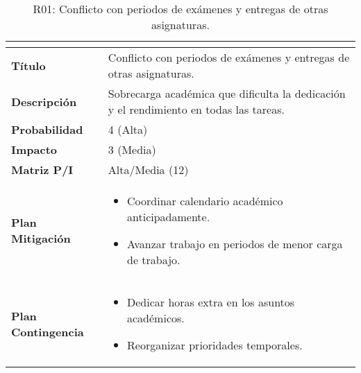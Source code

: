 \begin{table}[H]
\centering
\begin{tabular}{|>{\bfseries}l|p{10cm}|}
\hline
\rowcolor{lightgray}
\multicolumn{2}{|c|}{\textbf{Riesgo R01}} \\ \hline
Título & Conflicto con periodos de exámenes y entregas de otras asignaturas.\\ \hline
Descripción & Sobrecarga académica que dificulta la dedicación y el rendimiento en todas las tareas. \\ \hline
Probabilidad & 4 (Alta) \cellcolor{orangerisk} \\ \hline
Impacto & 3 (Media) \cellcolor{yellowrisk}\\ \hline
Matriz P/I & Alta/Media (12)\\ \hline
Plan Mitigación & 
\begin{itemize}
\item Coordinar calendario académico anticipadamente.
\item Avanzar trabajo en periodos de menor carga de trabajo.
\end{itemize} \\ \hline
Plan Contingencia & 
\begin{itemize}
\item Dedicar horas extra en los asuntos académicos.
\item Reorganizar prioridades temporales.
\end{itemize} \\ \hline
\end{tabular}
\caption{R01: Conflicto con periodos de exámenes y entregas de otras asignaturas.}
\label{tab:R01}
\end{table}


